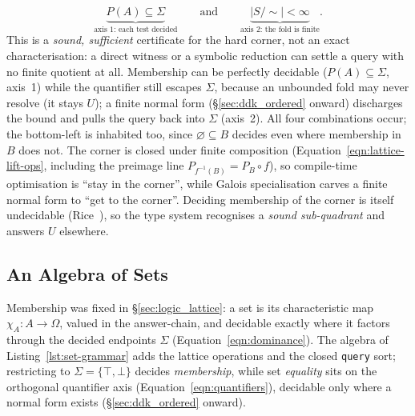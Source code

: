 \documentclass[11pt, a4paper]{article}
\begin{document}
\begin{equation}
\label{eqn:corner}
\underbrace{P(A) \subseteq \Sigma}_{\text{axis 1: each test decided}}
\qquad\text{and}\qquad
\underbrace{\lvert S/{\sim}\rvert < \infty}_{\text{axis 2: the fold is finite}} .
\end{equation}
This is a \emph{sound, sufficient} certificate for the hard corner, not an exact characterisation: a direct witness or a symbolic reduction can settle a query with no finite quotient at all.
Membership can be perfectly decidable ($P(A) \subseteq \Sigma$, axis~1) while the quantifier still escapes $\Sigma$, because an unbounded fold may never resolve (it stays $U$); a finite normal form (§\ref{sec:ddk_ordered} onward) discharges the bound and pulls the query back into $\Sigma$ (axis~2).
All four combinations occur; the bottom-left is inhabited too, since $\varnothing \subseteq B$ decides even where membership in $B$ does not.
The corner is closed under finite composition (Equation~\ref{eqn:lattice-lift-ops}, including the preimage line $P_{f^{-1}(B)} = P_B \circ f$), so compile-time optimisation is ``stay in the corner'', while Galois specialisation carves a finite normal form to ``get to the corner''.
Deciding membership of the corner is itself undecidable (Rice~\cite{rice1953classes}), so the type system recognises a \emph{sound sub-quadrant} and answers $U$ elsewhere.

\subsection{An Algebra of Sets}
\label{sec:ddk_comprehension}

Membership was fixed in §\ref{sec:logic_lattice}: a set is its characteristic map $\chi_A : A \to \Omega$, valued in the answer-chain, and decidable exactly where it factors through the decided endpoints $\Sigma$ (Equation~\ref{eqn:dominance}).
The algebra of Listing~\ref{lst:set-grammar} adds the lattice operations and the closed \texttt{query} sort; restricting to $\Sigma = \{\top, \bot\}$ decides \emph{membership}, while set \emph{equality} sits on the orthogonal quantifier axis (Equation~\ref{eqn:quantifiers}), decidable only where a normal form exists (§\ref{sec:ddk_ordered} onward).
\end{document}
